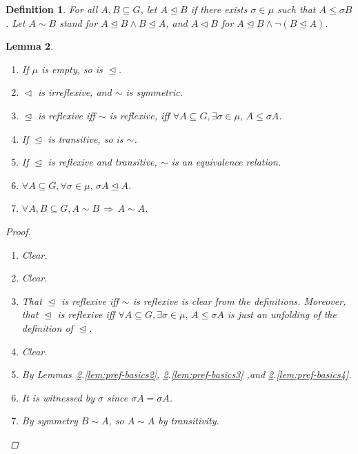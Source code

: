 \documentclass[11pt]{article}
\newtheorem{definition}{Definition}
\newtheorem{lemma}[definition]{Lemma}
\newcommand{\releq}{\mathrel{\trianglelefteq}}
\newcommand{\rel}{\mathrel{\triangleleft}}
\begin{document}
\begin{definition}
For all $A,B \subseteq G$, let $A \releq B$ if there exists $\sigma \in \mu$ such that $A \leq \sigma B$. Let $A \sim B$ stand for $A \releq B \land B \releq A$, and $A \rel B$ for $A \releq B \land \neg(B \releq A)$.
\end{definition}


\begin{lemma}\label{lem:pref-basics}
\begin{enumerate}

 \item\label{lem:pref-basics1} If $\mu$ is empty, so is $\releq$. 
 
 \item\label{lem:pref-basics2} $\rel$ is irreflexive, and $\sim$ is symmetric.

 \item\label{lem:pref-basics3} $\releq$ is reflexive iff $\sim$ is reflexive, iff $\forall A \subseteq G, \exists \sigma \in \mu,\, A \leq \sigma A$.
 
 \item\label{lem:pref-basics4} If $\releq$ is transitive, so is $\sim$.
 
 \item\label{lem:pref-basics5} If $\releq$ is reflexive and transitive, $\sim$ is an equivalence relation.
 
  \item\label{lem:pref-basics6} $\forall A \subseteq G, \forall \sigma \in \mu,\, \sigma A \releq A$.
  
    \item\label{lem:pref-basics7} $\forall A,B \subseteq G, A \sim B \,\Rightarrow\, A \sim A$.
\end{enumerate}

\begin{proof}
 \begin{enumerate}
 \item Clear.
 
  \item Clear.
  
  \item That $\releq$ is reflexive iff $\sim$ is reflexive is clear from the definitions. Moreover, that $\releq$ is reflexive iff $\forall A \subseteq G, \exists \sigma \in \mu,\, A \leq \sigma A$ is just an unfolding of the definition of $\releq$.
  
  \item Clear.
  
  \item By Lemmas~\ref{lem:pref-basics}.\ref{lem:pref-basics2}, 
 \ref{lem:pref-basics}.\ref{lem:pref-basics3} ,and \ref{lem:pref-basics}.\ref{lem:pref-basics4}.
 
 \item It is witnessed by $\sigma$ since $\sigma A = \sigma A$.
 
 \item By symmetry $B \sim A$, so $A \sim A$ by transitivity.
 \end{enumerate}
\end{proof}
\end{lemma}
\end{document}
